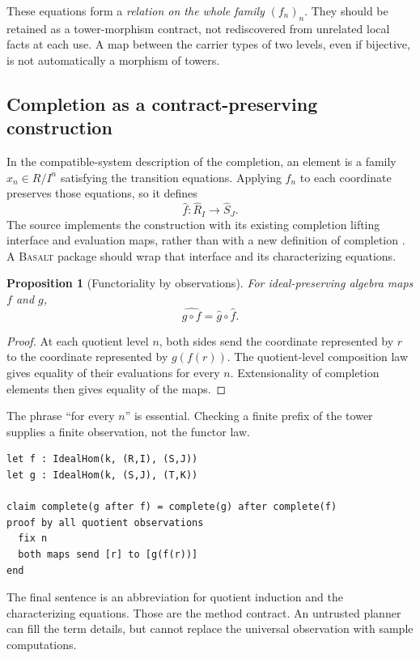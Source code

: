 \documentclass[11pt,a4paper]{article}
\newcommand{\Basalt}{\textsc{Basalt}}
\theoremstyle{plain}
\newtheorem{proposition}{Proposition}[section]
\theoremstyle{definition}
\theoremstyle{remark}
\begin{document}
These equations form a \emph{relation on the whole family} $(f_n)_n$.
They should be retained as a tower-morphism contract, not rediscovered from
unrelated local facts at each use. A map between the carrier types of two
levels, even if bijective, is not automatically a morphism of towers.

\subsection{Completion as a contract-preserving construction}
In the compatible-system description of the completion, an element is a family
$x_n\in R/I^n$ satisfying the transition equations. Applying $f_n$ to each
coordinate preserves those equations, so it defines
\[
 \widehat f:\widehat R_I\longrightarrow\widehat S_J.
\]
The source implements the construction with its existing completion lifting
interface and evaluation maps, rather than with a new definition of completion
\cite{completionsource}. A \Basalt{} package should wrap that interface and
its characterizing equations.

\begin{proposition}[Functoriality by observations]
For ideal-preserving algebra maps $f$ and $g$,
\[
 \widehat{g\circ f}=\widehat g\circ\widehat f.
\]
\end{proposition}
\begin{proof}
At each quotient level $n$, both sides send the coordinate represented by
$r$ to the coordinate represented by $g(f(r))$. The quotient-level composition
law gives equality of their evaluations for every $n$. Extensionality of
completion elements then gives equality of the maps.
\end{proof}
The phrase ``for every $n$'' is essential. Checking a finite prefix of the
tower supplies a finite observation, not the functor law.

\par\noindent\begin{minipage}{\linewidth}
\begin{lstlisting}
let f : IdealHom(k, (R,I), (S,J))
let g : IdealHom(k, (S,J), (T,K))

claim complete(g after f) = complete(g) after complete(f)
proof by all quotient observations
  fix n
  both maps send [r] to [g(f(r))]
end
\end{lstlisting}
\end{minipage}\par

The final sentence is an abbreviation for quotient induction and the
characterizing equations. Those are the method contract. An untrusted planner
can fill the term details, but cannot replace the universal observation with
sample computations.
\end{document}
